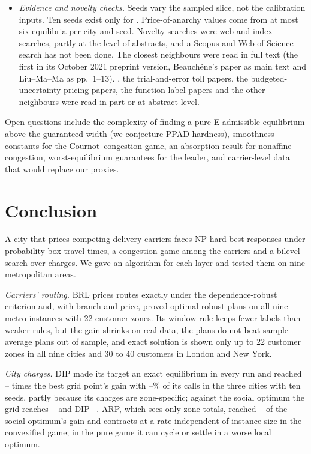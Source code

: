 \documentclass[preprint,11pt]{elsarticle}
\theoremstyle{definition}
\theoremstyle{remark}
\begin{document}
\begin{itemize}[leftmargin=*,itemsep=0pt]
\item \emph{Evidence and novelty checks.} Seeds vary the sampled slice, not the calibration inputs. Ten seeds exist only for \TenFullCities. Price-of-anarchy values come from at most six equilibria per city and seed. Novelty searches were web and index searches, partly at the level of abstracts, and a Scopus and Web of Science search has not been done. The closest neighbours \citep{GhosalHoWiesemann2024,Masiha2026,Feik2026,Beauchene2016,LiuMaMa2026,Irnich2008} were read in full text (the first in its October 2021 preprint version, Beauch\^ene's paper as main text and Liu--Ma--Ma as pp.\ 1--13). \citet{Lanzetti2025}, the trial-and-error toll papers, the budgeted-uncertainty pricing papers, the function-label papers \citep{Dabia2013,Ioachim1998} and the other neighbours were read in part or at abstract level.
\end{itemize}
Open questions include the complexity of finding a pure E-admissible equilibrium above the guaranteed width (we conjecture PPAD-hardness), smoothness constants for the Cournot--congestion game, an absorption result for nonaffine congestion, worst-equilibrium guarantees for the leader, and carrier-level data that would replace our proxies.

\section{Conclusion}\label{sec:conclusion}

A city that prices competing delivery carriers faces NP-hard best responses under probability-box travel times, a congestion game among the carriers and a bilevel search over charges. We gave an algorithm for each layer and tested them on nine metropolitan areas.

\emph{Carriers' routing.} BRL prices routes exactly under the dependence-robust criterion and, with branch-and-price, proved optimal robust plans on all nine metro instances with 22 customer zones. Its window rule keeps fewer labels than weaker rules, but the gain shrinks on real data, the plans do not beat sample-average plans out of sample, and exact solution is shown only up to 22 customer zones in all nine cities and 30 to 40 customers in London and New York.

\emph{City charges.} DIP made its target an exact equilibrium in every run and reached \TenDipGridBuenosAires--\TenDipGridNewDelhi{} times the best grid point's gain with \TenDipCallsNewDelhi--\TenDipCallsLondon\% of its calls in the three cities with ten seeds, partly because its charges are zone-specific; against the social optimum the grid reaches \TenSoGridNewDelhi--\TenSoGridBuenosAires{} and DIP \TenSoDipNewDelhi--\TenSoDipLondon. ARP, which sees only zone totals, reached \TenSoArpNewDelhi--\TenSoArpBuenosAires{} of the social optimum's gain and contracts at a rate independent of instance size in the convexified game; in the pure game it can cycle or settle in a worse local optimum.
\end{document}
